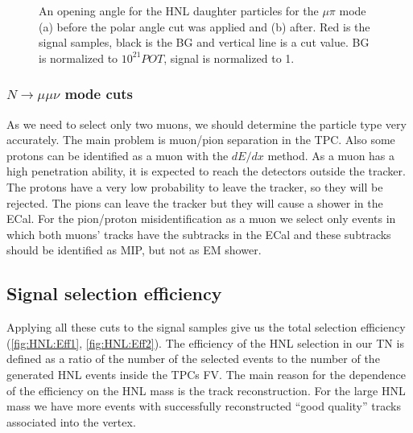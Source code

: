 \documentclass[../main.tex]{subfiles}
\begin{document}
\begin{figure}[!ht]
  \begin{minipage}[h]{0.49\linewidth}
  \end{minipage}
  \hfill
  \begin{minipage}[h]{0.49\linewidth}
  \end{minipage}
  \caption{An opening angle for the HNL daughter particles for the $\mu\pi$ mode (a) before the polar angle cut was applied and (b) after. Red is the signal samples, black is the BG and vertical line is a cut value. BG is normalized to $10^{21}POT$, signal is normalized to 1.}
  \label{fig:HNL:kin3}
\end{figure}

\subsubsection{\texorpdfstring{$N\to\mu\mu\nu$}{Lg}  mode cuts}
As we need to select only two muons, we should determine the particle type very accurately. The main problem is muon/pion separation in the TPC. Also some protons can be identified as a muon with the $dE/dx$ method. As a muon has a high penetration ability, it is expected to reach the detectors outside the tracker. The protons have a very low probability to leave the tracker, so they will be rejected. The pions can leave the tracker but they will cause a shower in the ECal. For the pion/proton misidentification as a muon we select only events in which both muons' tracks have the subtracks in the ECal and these subtracks should be identified as MIP, but not as EM shower.

\subsection{Signal selection efficiency}
\label{sec:HNL:eff}

Applying all these cuts to the signal samples give us the total selection efficiency (\autoref{fig:HNL:Eff1}, \autoref{fig:HNL:Eff2}). The efficiency of the HNL selection in our TN is defined as a ratio of the number of the selected events to the number of the generated HNL events inside the TPCs FV. The main reason for the dependence of the efficiency on the HNL mass is the track reconstruction. For the large HNL mass we have more events with successfully reconstructed ``good quality'' tracks associated into the vertex.
\end{document}
